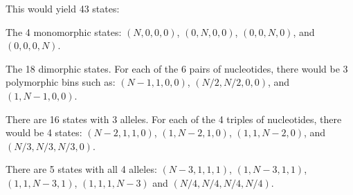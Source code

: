 \documentclass{llncs}
\begin{document}
This would yield 43 states:
\begin{compactenum}
    \item The 4 monomorphic states: $(N,0,0,0)$, $(0,N,0,0)$, $(0,0,N,0)$, and $(0,0,0,N)$.
    \item The 18 dimorphic states. For each of the 6 pairs of nucleotides,
    there would be 3 polymorphic bins such as:
    $(N-1, 1, 0, 0)$, $(N/2,N/2,0,0)$, and $(1, N-1, 0, 0)$.
    \item There are 16 states with 3 alleles. For each of the 4 triples of nucleotides,
    there would be 4 states:
    $(N-2, 1, 1, 0)$, $(1, N-2, 1, 0)$, $(1, 1, N-2, 0)$, and $(N/3, N/3, N/3, 0)$.
    \item There are 5 states with all 4 alleles:
    $(N-3, 1, 1, 1)$, $(1, N-3, 1, 1)$, $(1, 1, N-3, 1)$, $(1, 1, 1, N-3)$ and $(N/4, N/4, N/4, N/4)$.
\end{compactenum}
\end{document}
